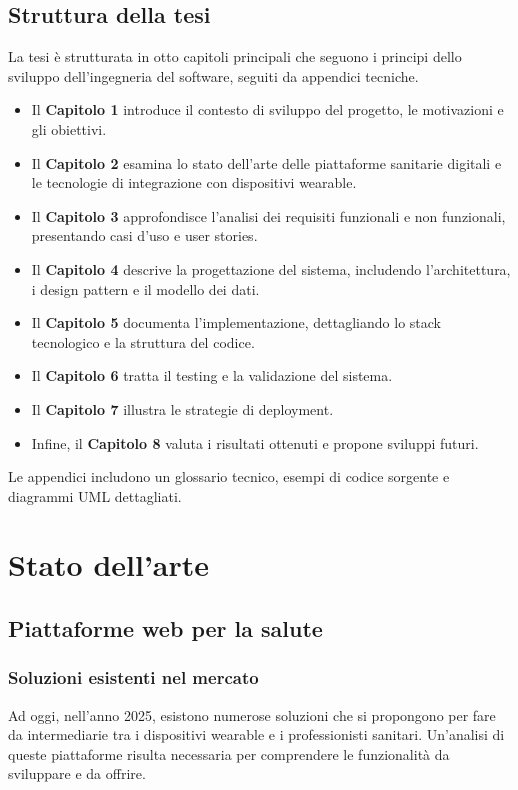 \documentclass[12pt,a4paper,oneside]{report}
\begin{document}
\section{Struttura della tesi}
La tesi è strutturata in otto capitoli principali che seguono i principi dello sviluppo dell'ingegneria del software, seguiti da appendici tecniche.
\begin{itemize}
    \item Il \textbf{Capitolo 1} introduce il contesto di sviluppo del progetto, le motivazioni e gli obiettivi.
    \item Il \textbf{Capitolo 2} esamina lo stato dell'arte delle piattaforme sanitarie digitali e le tecnologie di integrazione con dispositivi wearable.
    \item Il \textbf{Capitolo 3} approfondisce l'analisi dei requisiti funzionali e non funzionali, presentando casi d'uso e user stories.
    \item Il \textbf{Capitolo 4} descrive la progettazione del sistema, includendo l'architettura, i design pattern e il modello dei dati.
    \item Il \textbf{Capitolo 5} documenta l'implementazione, dettagliando lo stack tecnologico e la struttura del codice.
    \item Il \textbf{Capitolo 6} tratta il testing e la validazione del sistema.
    \item Il \textbf{Capitolo 7} illustra le strategie di deployment.
    \item Infine, il \textbf{Capitolo 8} valuta i risultati ottenuti e propone sviluppi futuri.
\end{itemize}
Le appendici includono un glossario tecnico, esempi di codice sorgente e diagrammi UML dettagliati.

\chapter{Stato dell'arte}

\section{Piattaforme web per la salute}

\subsection{Soluzioni esistenti nel mercato}
Ad oggi, nell'anno 2025, esistono numerose soluzioni che si propongono per fare da intermediarie tra i dispositivi wearable e i professionisti sanitari. Un'analisi di queste piattaforme risulta necessaria per comprendere le funzionalità da sviluppare e da offrire.
\end{document}

